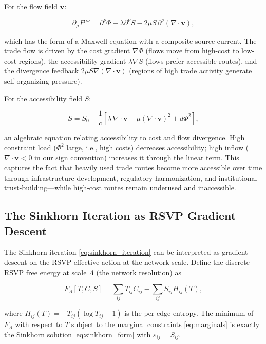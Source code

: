 \documentclass[12pt]{article}
\newcommand{\divv}{\nabla\!\cdot\!\mathbf{v}}
\newcommand{\Tij}{T_{ij}}
\newcommand{\Cij}{C_{ij}}
\newcommand{\eps}{\varepsilon}
\begin{document}
For the flow field $\mathbf{v}$:

\begin{equation}
\partial_\mu F^{\mu\nu} = \partial^\nu\Phi - \lambda\partial^\nu S - 2\mu S\,\partial^\nu(\divv),
\label{eq:v_dynamics}
\end{equation}

which has the form of a Maxwell equation with a composite source current. The trade flow is driven by the cost gradient $\nabla\Phi$ (flows move from high-cost to low-cost regions), the accessibility gradient $\lambda\nabla S$ (flows prefer accessible routes), and the divergence feedback $2\mu S\nabla(\divv)$ (regions of high trade activity generate self-organizing pressure).

For the accessibility field $S$:

\begin{equation}
S = S_0 - \frac{1}{c}\left[\lambda\,\divv - \mu(\divv)^2 + d\Phi^2\right],
\label{eq:S_dynamics}
\end{equation}

an algebraic equation relating accessibility to cost and flow divergence. High constraint load ($\Phi^2$ large, i.e., high costs) decreases accessibility; high inflow ($\divv < 0$ in our sign convention) increases it through the linear term. This captures the fact that heavily used trade routes become more accessible over time through infrastructure development, regulatory harmonization, and institutional trust-building---while high-cost routes remain underused and inaccessible.

\subsection{The Sinkhorn Iteration as RSVP Gradient Descent}

The Sinkhorn iteration \eqref{eq:sinkhorn_iteration} can be interpreted as gradient descent on the RSVP effective action at the network scale. Define the discrete RSVP free energy at scale $\Lambda$ (the network resolution) as

\begin{equation}
F_\Lambda[T, C, S] = \sum_{ij} \Tij \Cij - \sum_{ij} S_{ij} H_{ij}(T),
\label{eq:discrete_free_energy}
\end{equation}

where $H_{ij}(T) = -\Tij(\log\Tij - 1)$ is the per-edge entropy. The minimum of $F_\Lambda$ with respect to $T$ subject to the marginal constraints \eqref{eq:marginals} is exactly the Sinkhorn solution \eqref{eq:sinkhorn_form} with $\eps_{ij} = S_{ij}$.
\end{document}
